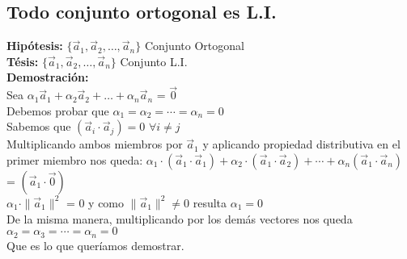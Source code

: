 \documentclass[11pt]{article}
\begin{document}
\subsection{Todo conjunto ortogonal es L.I.}
\textbf{Hipótesis:} $\{\vec{a}_1, \vec{a}_2, \hdots, \vec{a}_n\}$ Conjunto Ortogonal \\
\textbf{Tésis:} $\{\vec{a}_1, \vec{a}_2, \hdots, \vec{a}_n\}$ Conjunto L.I.\\
\textbf{Demostración:} \\
Sea $\alpha_1\vec{a}_1 + \alpha_2\vec{a}_2 + \hdots + \alpha_n\vec{a}_n$ = $\vec{0}$ \\Debemos probar que $\alpha_1=\alpha_2=\cdots=\alpha_n=0$ \\
Sabemos que $(\vec{a}_i\cdot\vec{a}_j) = 0$ $\forall i \neq j$\\
Multiplicando ambos miembros por $\vec{a}_1$ y aplicando propiedad distributiva en el primer miembro nos queda: 
$\alpha_1\cdot(\vec{a}_1\cdot\vec{a}_1) + \alpha_2\cdot(\vec{a}_1\cdot\vec{a}_2) + \cdots + \alpha_n(\vec{a}_1\cdot\vec{a}_n)$ = $(\vec{a}_1\cdot\vec{0})$\\
$\alpha_1\cdot\parallel\vec{a}_1\parallel^2$ = $0$ y como $\parallel\vec{a}_1\parallel^2 \neq 0$ resulta $\alpha_1 = 0$\\
De la misma manera, multiplicando por los demás vectores nos queda $\alpha_2=\alpha_3=\cdots=\alpha_n=0$\\
Que es lo que queríamos demostrar.
\end{document}
